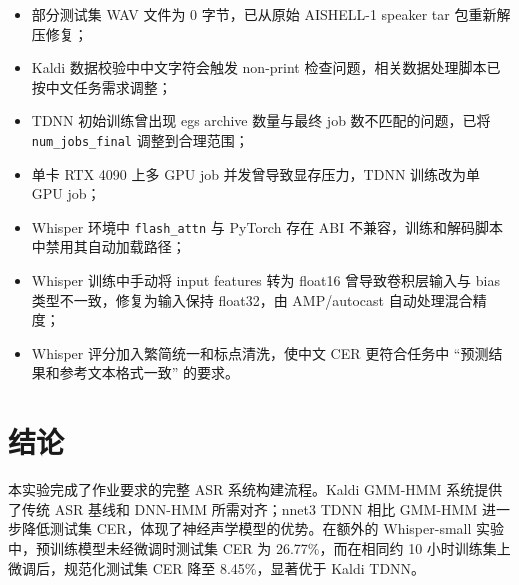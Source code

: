 \documentclass[UTF8,a4paper,12pt]{ctexart}
\begin{document}
\begin{itemize}
  \item 部分测试集 WAV 文件为 0 字节，已从原始 AISHELL-1 speaker tar 包重新解压修复；
  \item Kaldi 数据校验中中文字符会触发 non-print 检查问题，相关数据处理脚本已按中文任务需求调整；
  \item TDNN 初始训练曾出现 egs archive 数量与最终 job 数不匹配的问题，已将 \texttt{num\_jobs\_final} 调整到合理范围；
  \item 单卡 RTX 4090 上多 GPU job 并发曾导致显存压力，TDNN 训练改为单 GPU job；
  \item Whisper 环境中 \texttt{flash\_attn} 与 PyTorch 存在 ABI 不兼容，训练和解码脚本中禁用其自动加载路径；
  \item Whisper 训练中手动将 input features 转为 float16 曾导致卷积层输入与 bias 类型不一致，修复为输入保持 float32，由 AMP/autocast 自动处理混合精度；
  \item Whisper 评分加入繁简统一和标点清洗，使中文 CER 更符合任务中 ``预测结果和参考文本格式一致'' 的要求。
\end{itemize}

\section{结论}

本实验完成了作业要求的完整 ASR 系统构建流程。Kaldi GMM-HMM 系统提供了传统 ASR 基线和 DNN-HMM 所需对齐；nnet3 TDNN 相比 GMM-HMM 进一步降低测试集 CER，体现了神经声学模型的优势。在额外的 Whisper-small 实验中，预训练模型未经微调时测试集 CER 为 26.77\%，而在相同约 10 小时训练集上微调后，规范化测试集 CER 降至 8.45\%，显著优于 Kaldi TDNN。
\end{document}
